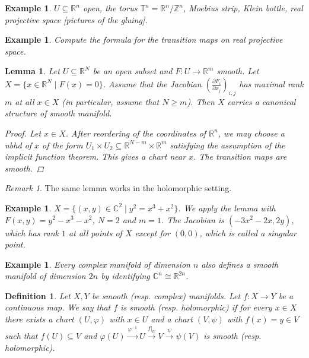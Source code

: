 \documentclass[12pt]{article}
\theoremstyle{darkgreentheorem}
\newtheorem{lm}[thm]{Lemma}
\theoremstyle{darkbluedefinition}
\newtheorem{defn}[thm]{Definition}
\theoremstyle{darkredexample}
\newtheorem{exa}[thm]{Example}
\theoremstyle{remark}
\newtheorem{rem}[thm]{Remark}
\newcommand{\Z}{\mathbb{Z}}
\newcommand{\R}{\mathbb{R}}
\newcommand{\1}{\mathbbm{1}}
\newcommand{\C}{\mathbb{C}}
\newcommand{\tms}{\times}
\newcommand{\sub}{\subseteq}
\begin{document}
\begin{exa}
    $U\sub \R^{n}$ open, the torus $\mathbb{T}^{n}=\R^{n}/\Z^{n}$, Moebius strip, Klein bottle, real projective space [pictures of the gluing].
\end{exa}

\begin{exa}
    Compute the formula for the transition maps on real projective space.
\end{exa}

\begin{lm}
    Let $U\sub \R^{N}$ be an open subset and $F\colon U\to \R^{m}$ smooth.
    Let $X=\{ x\in \R^{N}\mid F(x)=0\}$.
    Assume that the Jacobian $(\frac{\partial F_{i}}{\partial x_{j}})_{i,j}$ has maximal rank $m$ at all $x\in X$ (in particular, assume that $N\geqslant m$).
    Then $X$ carries a canonical structure of smooth manifold.
    \begin{proof}
	Let $x\in X$.
	After reordering of the coordinates of $\R^{n}$, we may choose a nbhd of $x$ of the form $U_{1}\tms U_{2}\sub \R^{N-m}\tms \R^{m}$ satisfying the assumption of the implicit function theorem.
	This gives a chart near $x$.
	The transition maps are smooth.
    \end{proof}
\end{lm}

\begin{rem}
    The same lemma works in the holomorphic setting.
\end{rem}

\begin{exa}
    $X=\{(x,y)\in \C^{2}\mid y^{2}=x^{3}+x^{2} \}$.
    We apply the lemma with $F(x,y)=y^{2}-x^{3}-x^{2}$, $N=2$ and $m=1$.
    The Jacobian is $(-3x^{2}-2x,2y)$, which has rank $1$ at all points of $X$ except for $(0,0)$, which is called a \textit{singular point}.
\end{exa}

\begin{exa}
    Every complex manifold of dimension $n$ also defines a smooth manifold of dimension $2n$ by identifying $\C^{n}\cong \R^{2n}$.
\end{exa}

\begin{defn}
    Let $X,Y$ be smooth (resp. complex) manifolds.
    Let $f\colon X\to Y$ be a continuous map.
    We say that $f$ is \textit{smooth} (resp. \textit{holomorphic}) if for every $x\in X$ there exists a chart $(U,\varphi)$ with $x\in U$ and a chart $(V,\psi)$ with $f(x)=y\in V$ such that $f(U)\sub V$ and $\varphi(U)\xrightarrow{\varphi^{-1}}U\xrightarrow{f|_{U}} V\xrightarrow{\psi} \psi(V)$ is smooth (resp. holomorphic).
\end{defn}
\end{document}
